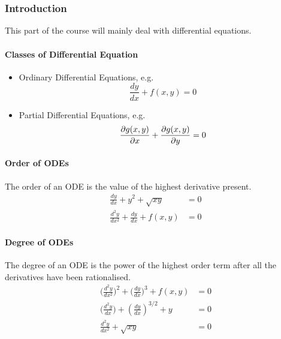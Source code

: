 \documentclass[Maths.tex]{subfiles}
\begin{document}
\part{}
\chapter{}
\section{Introduction}
This part of the course will mainly deal with differential equations.
\subsection{Classes of Differential Equation}
\begin{itemize}
    \item Ordinary Differential Equations, e.g.
        \begin{equation}
            \frac{dy}{dx} + f(x, y) = 0
        \end{equation}
    \item Partial Differential Equations, e.g.
        \begin{equation}
            \frac{\partial g(x, y)}{\partial x} + \frac{\partial g(x, y)}{\partial y} = 0
        \end{equation}
\end{itemize}

\subsection{Order of ODEs}
The order of an ODE is the value of the highest derivative present.
\begin{align}
    \frac{dy}{dx} + y^2 + \sqrt{xy} &= 0 \tag{1st Order} \\
    \frac{d^2y}{dx^2} + \frac{dy}{dx} + f(x, y) &= 0 \tag{2nd Order}
\end{align}

\subsection{Degree of ODEs}
The degree of an ODE is the power of the highest order term after all the derivatives have been rationalised.
\begin{align}
    \bigg(\frac{d^2y}{dx^2}\bigg)^2 + \bigg(\frac{dy}{dx}\bigg)^3 + f(x, y) &= 0 \tag{2nd Degree} \\
    \bigg(\frac{d^2y}{dx}\bigg) + \left(\frac{dy}{dx}\right)^{3/2} + y &= 0 \tag{4th Degree} \\
    \frac{d^2y}{dx^2} + \sqrt{xy} &= 0 \tag{2nd Degree}
\end{align}
\end{document}
